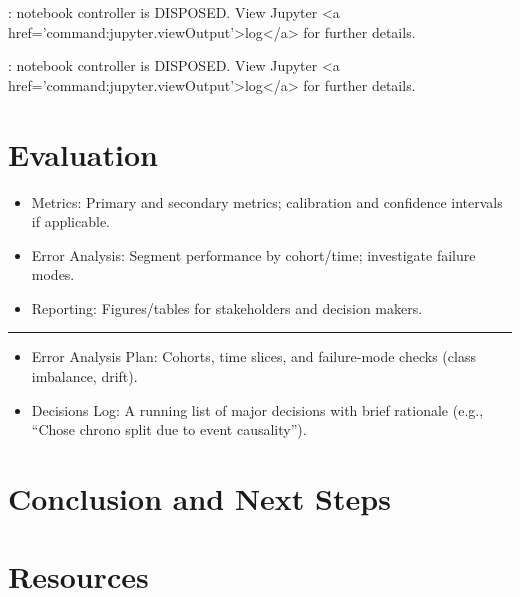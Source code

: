 \documentclass[
  letterpaper,
  DIV=11,
  numbers=noendperiod]{scrartcl}
\providecommand{\tightlist}{%
  \setlength{\itemsep}{0pt}\setlength{\parskip}{0pt}}
\begin{document}
\begin{Highlighting}
\textcolor{black}{: }
\textcolor{black}{}\textcolor{QuartoInternalColor1}{notebook controller is DISPOSED. }
\textcolor{QuartoInternalColor1}{}\textcolor{QuartoInternalColor1}{View Jupyter <a href='command:jupyter.viewOutput'>log</a> for further details.}
\end{Highlighting}

\begin{Highlighting}
\textcolor{black}{: }
\textcolor{black}{}\textcolor{QuartoInternalColor1}{notebook controller is DISPOSED. }
\textcolor{QuartoInternalColor1}{}\textcolor{QuartoInternalColor1}{View Jupyter <a href='command:jupyter.viewOutput'>log</a> for further details.}
\end{Highlighting}

\section{Evaluation}\label{evaluation}

\begin{itemize}
\tightlist
\item
  Metrics: Primary and secondary metrics; calibration and confidence
  intervals if applicable.
\item
  Error Analysis: Segment performance by cohort/time; investigate
  failure modes.
\item
  Reporting: Figures/tables for stakeholders and decision makers.
\end{itemize}

\begin{center}\rule{0.5\linewidth}{0.5pt}\end{center}

\begin{itemize}
\tightlist
\item
  Error Analysis Plan: Cohorts, time slices, and failure-mode checks
  (class imbalance, drift).
\item
  Decisions Log: A running list of major decisions with brief rationale
  (e.g., ``Chose chrono split due to event causality'').
\end{itemize}

\section{Conclusion and Next Steps}\label{conclusion-and-next-steps}

\section{Resources}\label{resources}
\end{document}
